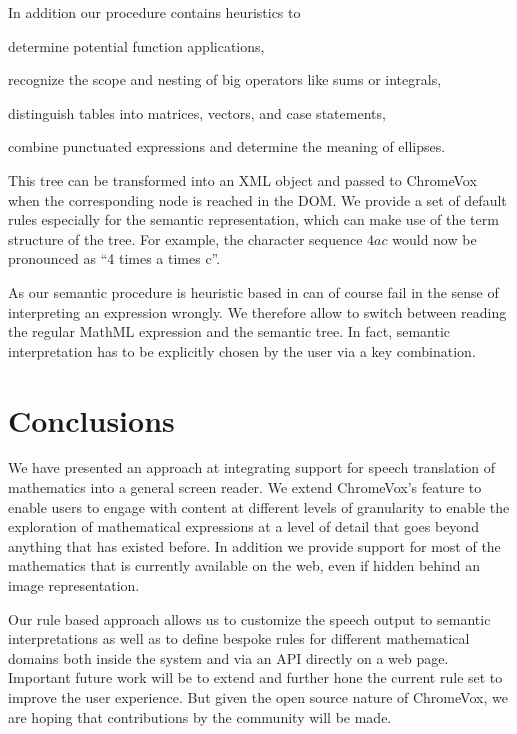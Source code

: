 \documentclass{sig-alternate}
\begin{document}
In addition our procedure contains heuristics to
\begin{inparaenum}[(a)]
\item determine potential function applications,
\item recognize the scope and nesting of big operators like sums or integrals,
\item distinguish tables into matrices, vectors, and case statements,
\item combine punctuated expressions and determine the meaning of ellipses.
\end{inparaenum}


This tree can be transformed into an XML object and passed to ChromeVox when the
corresponding node is reached in the DOM. We provide a set of default rules
especially for the semantic representation, which can make use of the term
structure of the tree. For example, the character sequence $4ac$ would now be
pronounced as ``4 times a times c''.

As our semantic procedure is heuristic based in can of course fail in the sense
of interpreting an expression wrongly. We therefore allow to switch between
reading the regular MathML expression and the semantic tree. In fact, semantic
interpretation has to be explicitly chosen by the user via a key combination.

\section{Conclusions}
\label{sec:conc}

We have presented an approach at integrating support for speech translation of
mathematics into a general screen reader. We extend ChromeVox's feature to
enable users to engage with content at different levels of granularity to enable
the exploration of mathematical expressions at a level of detail that goes
beyond anything that has existed before. In addition we provide support for most
of the mathematics that is currently available on the web, even if hidden behind
an image representation.

Our rule based approach allows us to customize the speech output to semantic
interpretations as well as to define bespoke rules for different mathematical
domains both inside the system and via an API directly on a web page.  Important
future work will be to extend and further hone the current rule set to improve
the user experience.  But given the open source nature of ChromeVox, we are
hoping that contributions by the community will be made.
\end{document}
